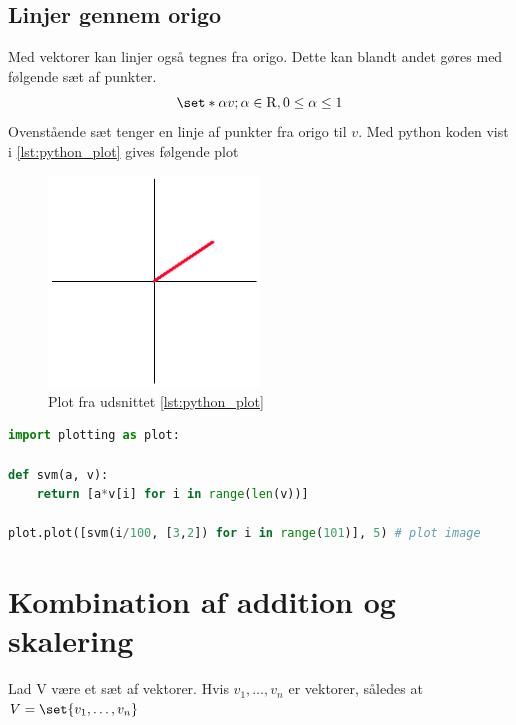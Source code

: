 \subsection{Linjer gennem origo}
Med vektorer kan linjer også tegnes fra origo.
Dette kan blandt andet gøres med følgende sæt af punkter.
\begin{equation}
	\label{eqn:origo}
	\set*{\alpha v; \alpha\in\mathrm{R},0\leq\alpha\leq1}
\end{equation}
Ovenstående sæt tenger en linje af punkter fra origo til $v$.
Med python koden vist i \cref{lst:python_plot} gives følgende plot
\begin{figure}[h]
	\centering
	\includegraphics[width=0.5\textwidth]{img/vecplot.png}
	\caption{Plot fra udsnittet \cref{lst:python_plot}}
	\label{fig:plot_line}
\end{figure}
\begin{lstlisting}[language=Python,label=lst:python_plot,caption={Python kode til at generere plot i \cref{fig:plot_line}.\\Koden kan findes i ./labs/vectors/python\_plot.py}]
import plotting as plot:

def svm(a, v):
    return [a*v[i] for i in range(len(v))]

plot.plot([svm(i/100, [3,2]) for i in range(101)], 5) # plot image
\end{lstlisting} 



\section{Kombination af addition og skalering}


\begin{frdef}
	Lad V være et sæt af vektorer.
Hvis $v_1,\dots,v_n$ er vektorer, således at $V=\set{v_1,\dots,v_n}$
\end{frdef}